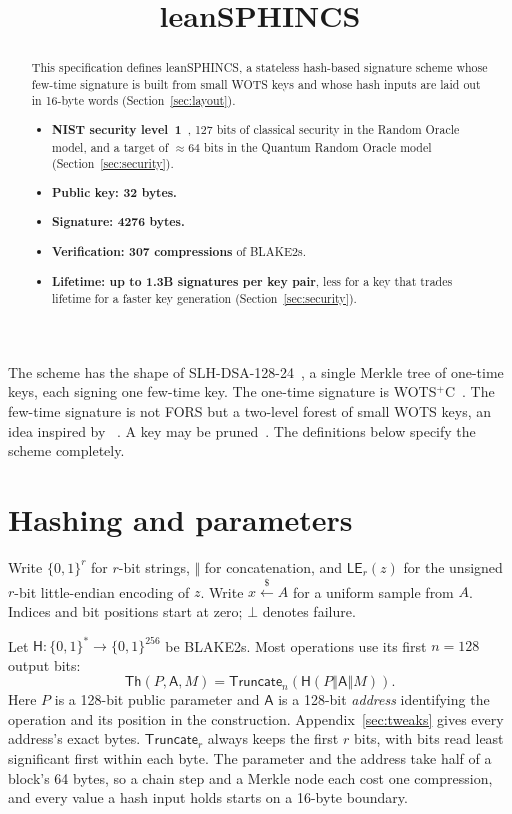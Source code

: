\documentclass[11pt]{article}
\title{leanSPHINCS}
\author{}
\date{}
\theoremstyle{plain}
\theoremstyle{definition}
\newcommand{\bits}[1]{\{0,1\}^{#1}}
\newcommand{\getsr}{\stackrel{\$}{\gets}}
\newcommand{\Th}{\mathsf{Th}}
\newcommand{\hash}{\mathsf{H}}
\newcommand{\LE}{\mathsf{LE}}
\newcommand{\Truncate}{\mathsf{Truncate}}
\newcommand{\concat}{\mathbin\Vert}
\newcommand{\addr}{\mathsf{A}}
\begin{document}
\maketitle

\begin{abstract}

This specification defines leanSPHINCS, a stateless hash-based signature scheme whose few-time signature is built from small WOTS keys and whose hash inputs are laid out in 16-byte words (Section~\ref{sec:layout}).

\begin{itemize}
  \item \textbf{NIST security level~1}~\cite{NISTPQC}, 127 bits of classical security in the Random Oracle model, and a target of $\approx 64$ bits in the Quantum Random Oracle model (Section~\ref{sec:security}).
  \item \textbf{Public key: 32 bytes.}
  \item \textbf{Signature: 4276 bytes.}
  \item \textbf{Verification: 307 compressions} of BLAKE2s.
  \item \textbf{Lifetime: up to 1.3B signatures per key pair}, less for a key that trades lifetime for a faster key generation (Section~\ref{sec:security}).
\end{itemize}
\end{abstract}

The scheme has the shape of SLH-DSA-128-24~\cite{SP800230}, a single Merkle tree of one-time keys, each signing one few-time key. The one-time signature is WOTS$^+$C~\cite{HK22C}. The few-time signature is not FORS but a two-level forest of small WOTS keys, an idea inspired by ~\cite{siggolf}. A key may be pruned~\cite{conduition}. The definitions below specify the scheme completely.

\section{Hashing and parameters}
\label{sec:parameters}

Write $\bits r$ for $r$-bit strings, $\concat$ for concatenation, and $\LE_r(z)$ for the unsigned $r$-bit little-endian encoding of $z$. Write $x\getsr A$ for a uniform sample from $A$. Indices and bit positions start at zero; $\bot$ denotes failure.

Let $\hash:\bits{*}\to\bits{256}$ be BLAKE2s. Most operations use its first $n=128$ output bits:
\[
  \Th(P,\addr,M)=\Truncate_n\!\left(\hash(P\concat\addr\concat M)\right).
\]
Here $P$ is a 128-bit public parameter and $\addr$ is a 128-bit \emph{address} identifying the operation and its position in the construction. Appendix~\ref{sec:tweaks} gives every address's exact bytes. $\Truncate_r$ always keeps the first $r$ bits, with bits read least significant first within each byte. The parameter and the address take half of a block's 64 bytes, so a chain step and a Merkle node each cost one compression, and every value a hash input holds starts on a 16-byte boundary.
\end{document}
